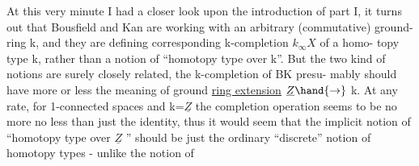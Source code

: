 At this very minute
I had a closer look upon the introduction of part I,  it turns out that
 Bousfield and Kan are working with an arbitrary (commutative) ground-%
ring k,  and they are defining corresponding k-completion  $k_{\infty}X$  of a homo-%
topy type k,  rather than a notion of ``homotopy type over k''.  But the two
kind of notions are surely closely related,  the k-completion of BK presu-%
mably should have more or less the meaning of ground \uline{ring extension} $\underline{Z}\hand{\to}$ k. 
At any rate,  for 1-connected spaces and k=$\underline{Z}$  the completion operation
seems to be no more no less than just the identity,  thus it would seem
that the implicit notion of ``homotopy type over $\underline{Z}$ ''  should be just the
ordinary ``discrete'' notion of homotopy types  -  unlike the notion of

